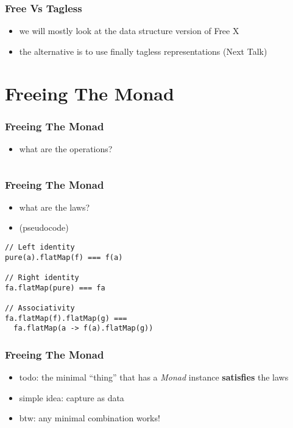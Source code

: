 \documentclass{beamer}
\begin{document}
\begin{frame}
  \frametitle{Free Vs Tagless}
  \begin{itemize}
  \item we will mostly look at the data structure version of Free X
  \item the alternative is to use finally tagless representations (Next Talk)
  \end{itemize}
\end{frame}

\section{Freeing The Monad}\label{sec:free-monad}
\begin{frame}[fragile]
  \frametitle{Freeing The Monad}
  \begin{itemize}
  \item what are the operations?
  \end{itemize}
  \begin{center}
    \inputminted{scala}{snippets/monad-typeclass.scala}
  \end{center}
\end{frame}

\begin{frame}[fragile]
  \frametitle{Freeing The Monad}
\begin{itemize}
\item what are the laws?
\item (pseudocode)
\end{itemize}
    \begin{center}
\begin{verbatim}
// Left identity
pure(a).flatMap(f) === f(a)

// Right identity
fa.flatMap(pure) === fa

// Associativity
fa.flatMap(f).flatMap(g) ===
  fa.flatMap(a -> f(a).flatMap(g))
\end{verbatim}
    \end{center}
\end{frame}

\begin{frame}[fragile]
  \frametitle{Freeing The Monad}
  \begin{itemize}
  \item todo: the minimal ``thing'' that has a \textit{Monad} instance
    \textbf{satisfies} the laws
  \item simple idea: capture as data
  \item btw: any minimal combination works!
  \end{itemize}
\end{frame}
\end{document}
